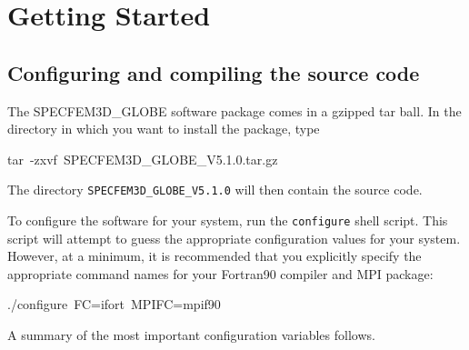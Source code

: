 \documentclass[oneside,english]{book}
\newenvironment{lyxcode}
{\begin{list}{}{
\setlength{\rightmargin}{\leftmargin}
\setlength{\listparindent}{0pt}%
\raggedright
\setlength{\itemsep}{0pt}
\setlength{\parsep}{0pt}
\normalfont\ttfamily}%
 \item[]}
{\end{list}}
\begin{document}
\chapter{\label{cha:Getting-Started}Getting Started}

\section{Configuring and compiling the source code}

The SPECFEM3D\_GLOBE software package comes in a gzipped tar ball.
In the directory in which you want to install the package, type

\begin{lyxcode}
tar~-zxvf~SPECFEM3D\_GLOBE\_V5.1.0.tar.gz
\end{lyxcode}
The directory \texttt{SPECFEM3D\_GLOBE\_V5.1.0} will then contain
the source code.

To configure the software for your system, run the \texttt{configure}
shell script. This script will attempt to guess the appropriate configuration
values for your system. However, at a minimum, it is recommended that
you explicitly specify the appropriate command names for your Fortran90
compiler and MPI package:

\begin{lyxcode}
./configure~FC=ifort~MPIFC=mpif90
\end{lyxcode}
A summary of the most important configuration variables follows.
\end{document}
